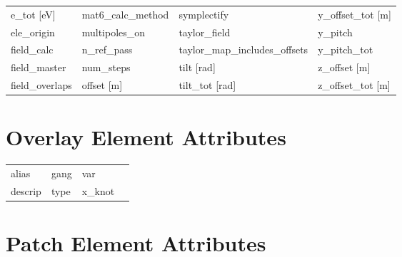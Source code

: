\begin{tabular}{llll}
e_tot [eV]                     & mat6_calc_method               & symplectify                    & y_offset_tot [m]               \\
ele_origin                     & multipoles_on                  & taylor_field                   & y_pitch                        \\
field_calc                     & n_ref_pass                     & taylor_map_includes_offsets    & y_pitch_tot                    \\
field_master                   & num_steps                      & tilt [rad]                     & z_offset [m]                   \\
field_overlaps                 & offset [m]                     & tilt_tot [rad]                 & z_offset_tot [m]               \\
 \bottomrule
 \end{tabular}
 \vfill
 
 \section{Overlay Element Attributes}
 \label{s:list.overlay}
 
 \begin{tabular}{llll} \toprule
alias                          & gang                           & var                            &                                \\
descrip                        & type                           & x_knot                         &                                \\
 \bottomrule
 \end{tabular}
 \vfill
 
 \section{Patch Element Attributes}
 \label{s:list.patch}
 
